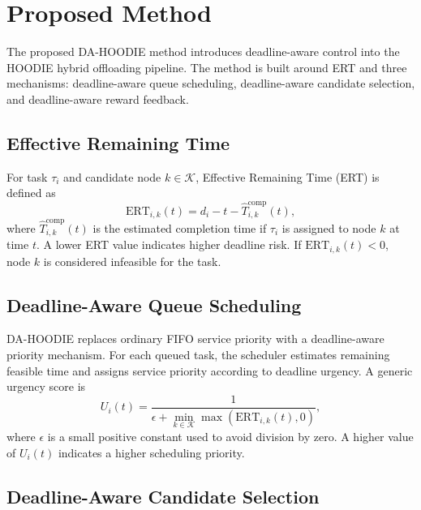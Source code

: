 \documentclass{article}
\begin{document}
\section{Proposed Method}
\label{sec:proposed_method}

The proposed DA-HOODIE method introduces deadline-aware control into the HOODIE hybrid offloading pipeline. The method is built around ERT and three mechanisms: deadline-aware queue scheduling, deadline-aware candidate selection, and deadline-aware reward feedback.

\subsection{Effective Remaining Time}
\label{subsec:effective_remaining_time}

For task $\tau_i$ and candidate node $k\in\mathcal{K}$, Effective Remaining Time (ERT) is defined as
\begin{equation}
    \mathrm{ERT}_{i,k}(t)=d_i-t-\widehat{T}^{\mathrm{comp}}_{i,k}(t),
\end{equation}
where $\widehat{T}^{\mathrm{comp}}_{i,k}(t)$ is the estimated completion time if $\tau_i$ is assigned to node $k$ at time $t$. A lower ERT value indicates higher deadline risk. If $\mathrm{ERT}_{i,k}(t)<0$, node $k$ is considered infeasible for the task.

\subsection{Deadline-Aware Queue Scheduling}
\label{subsec:deadline_aware_queue_scheduling}

DA-HOODIE replaces ordinary FIFO service priority with a deadline-aware priority mechanism. For each queued task, the scheduler estimates remaining feasible time and assigns service priority according to deadline urgency. A generic urgency score is
\begin{equation}
    U_i(t)=\frac{1}{\epsilon+\min_{k\in\mathcal{K}}\max(\mathrm{ERT}_{i,k}(t),0)},
\end{equation}
where $\epsilon$ is a small positive constant used to avoid division by zero. A higher value of $U_i(t)$ indicates a higher scheduling priority.

\subsection{Deadline-Aware Candidate Selection}
\label{subsec:deadline_aware_candidate_selection}
\end{document}
